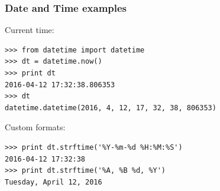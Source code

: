 \documentclass[aspectratio=1610,9pt]{beamer} %
\begin{document}
\begin{frame}[fragile]
\frametitle{Date and Time examples}

Current time:

\begin{verbatim}
>>> from datetime import datetime
>>> dt = datetime.now()
>>> print dt
2016-04-12 17:32:38.806353
>>> dt
datetime.datetime(2016, 4, 12, 17, 32, 38, 806353)
\end{verbatim}

Custom formats:

\begin{verbatim}
>>> print dt.strftime('%Y-%m-%d %H:%M:%S')
2016-04-12 17:32:38
>>> print dt.strftime('%A, %B %d, %Y')
Tuesday, April 12, 2016
\end{verbatim}

\end{frame}
\end{document}
